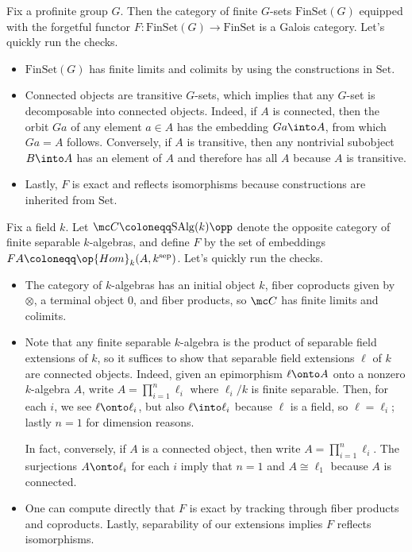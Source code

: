 \documentclass{amsart}
\begin{document}
\begin{example} \label{ex:g-sets}
    Fix a profinite group $G$. Then the category of finite $G$-sets $\mathrm{FinSet}(G)$ equipped with the forgetful functor $F\colon\mathrm{FinSet}(G)\to\mathrm{FinSet}$ is a Galois category. Let's quickly run the checks.
    \begin{itemize}
        \item $\mathrm{FinSet}(G)$ has finite limits and colimits by using the constructions in $\mathrm{Set}$.
        \item Connected objects are transitive $G$-sets, which implies that any $G$-set is decomposable into connected objects. Indeed, if $A$ is connected, then the orbit $Ga$ of any element $a\in A$ has the embedding $Ga\into A$, from which $Ga=A$ follows. Conversely, if $A$ is transitive, then any nontrivial subobject $B\into A$ has an element of $A$ and therefore has all $A$ because $A$ is transitive.
        \item Lastly, $F$ is exact and reflects isomorphisms because constructions are inherited from $\mathrm{Set}$.
    \end{itemize}
\end{example}
\begin{example} \label{ex:salgk}
    Fix a field $k$. Let $\mc C\coloneqq\mathrm{SAlg}(k)\opp$ denote the opposite category of finite separable $k$-algebras, and define $F$ by the set of embeddings $FA\coloneqq\op{Hom}_k(A,k^{\mathrm{sep}})$. Let's quickly run the checks.
    \begin{itemize}
        \item The category of $k$-algebras has an initial object $k$, fiber coproducts given by $\otimes$, a terminal object $0$, and fiber products, so $\mc C$ has finite limits and colimits.
        \item Note that any finite separable $k$-algebra is the product of separable field extensions of $k$, so it suffices to show that separable field extensions $\ell$ of $k$ are connected objects. Indeed, given an epimorphism $\ell\onto A$ onto a nonzero $k$-algebra $A$, write $A=\prod_{i=1}^n\ell_i$ where $\ell_i/k$ is finite separable. Then, for each $i$, we see $\ell\onto\ell_i$, but also $\ell\into\ell_i$ because $\ell$ is a field, so $\ell=\ell_i$; lastly $n=1$ for dimension reasons.

        In fact, conversely, if $A$ is a connected object, then write $A=\prod_{i=1}^n\ell_i$. The surjections $A\onto\ell_i$ for each $i$ imply that $n=1$ and $A\cong\ell_1$ because $A$ is connected.
        \item One can compute directly that $F$ is exact by tracking through fiber products and coproducts. Lastly, separability of our extensions implies $F$ reflects isomorphisms.
    \end{itemize}
\end{example}
\end{document}
